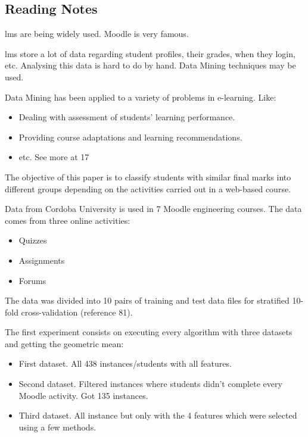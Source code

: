 \subsection{Reading Notes}

\Gls{lms} are being widely used. Moodle is very famous.

\Gls{lms} store a lot of data regarding student profiles, their grades, when
they login, etc. Analysing this data is hard to do by hand. Data Mining
techniques may be used.

Data Mining has been applied to a variety of problems in e-learning. Like:

\begin{itemize}
    \item Dealing with assessment of students' learning performance.
    \item Providing course adaptations and learning recommendations.
    \item etc. See more at 17
\end{itemize}

The objective of this paper is to classify students with similar final marks
into different groups depending on the activities carried out in a web-based
course.

Data from Cordoba University is used in 7 Moodle engineering courses. The data
comes from three online activities:

\begin{itemize}
    \item Quizzes
    \item Assignments
    \item Forums
\end{itemize}

The data was divided into 10 pairs of training and test data files for
stratified 10-fold cross-validation (reference 81).

The first experiment consists on executing every algorithm with three datasets
and getting the geometric mean:

\begin{itemize}
    \item First dataset. All 438 instances/students with all features.
    \item Second dataset. Filtered instances where students didn't complete
        every Moodle activity. Got 135 instances.
    \item Third dataset. All instance but only with the 4 features which were
        selected using a few methods.
\end{itemize}

